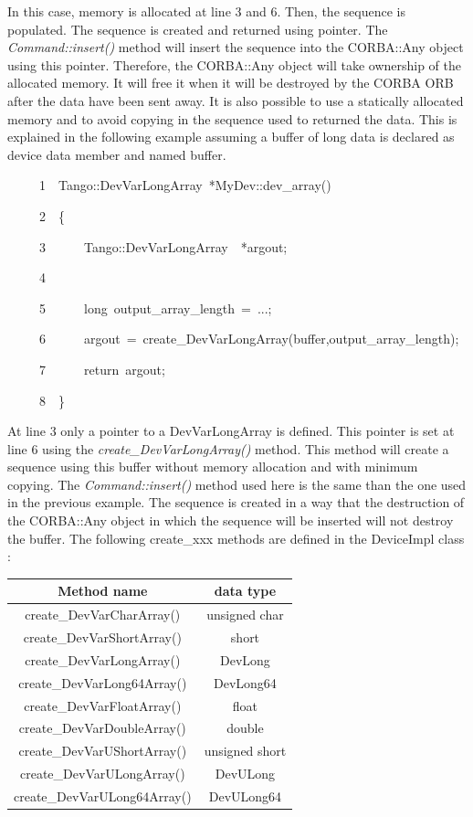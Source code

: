 In this case, memory is allocated at line 3 and 6. Then, the sequence
is populated. The sequence is created and returned using pointer.
The \emph{Command::insert()} method will insert the sequence into
the CORBA::Any object using this pointer. Therefore, the CORBA::Any
object will take ownership of the allocated memory. It will free it
when it will be destroyed by the CORBA ORB after the data have been
sent away. It is also possible to use a statically allocated memory
and to avoid copying in the sequence used to returned the data. This
is explained in the following example assuming a buffer of long data
is declared as device data member and named buffer.


\begin{lyxcode}
~~~~~1~~Tango::DevVarLongArray~{*}MyDev::dev\_array()

~~~~~2~~\{

~~~~~3~~~~~~Tango::DevVarLongArray~~{*}argout;

~~~~~4~~~~~~~~~~~~~~~~~~

~~~~~5~~~~~~long~output\_array\_length~=~...;

~~~~~6~~~~~~argout~=~create\_DevVarLongArray(buffer,output\_array\_length);

~~~~~7~~~~~~return~argout;

~~~~~8~~\}
\end{lyxcode}


At line 3 only a pointer to a DevVarLongArray is defined. This pointer
is set at line 6 using the \emph{create\_DevVarLongArray()}
method. This method will create a sequence using this buffer without
memory allocation and with minimum copying. The \emph{Command::insert()}
method used here is the same than the one used in the previous example.
The sequence is created in a way that the destruction of the CORBA::Any
object in which the sequence will be inserted will not destroy the
buffer. The following create\_xxx methods are defined in the DeviceImpl
class :

\vspace{0.3cm}

\begin{center}
\begin{longtable}{|c|c|}
\hline 
Method name & data type\tabularnewline
\hline 
\hline 
create\_DevVarCharArray() & unsigned char\tabularnewline
\hline 
create\_DevVarShortArray() & short\tabularnewline
\hline 
create\_DevVarLongArray() & DevLong\tabularnewline
\hline 
create\_DevVarLong64Array() & DevLong64\tabularnewline
\hline 
create\_DevVarFloatArray() & float\tabularnewline
\hline 
create\_DevVarDoubleArray() & double\tabularnewline
\hline 
create\_DevVarUShortArray() & unsigned short\tabularnewline
\hline 
create\_DevVarULongArray() & DevULong\tabularnewline
\hline 
create\_DevVarULong64Array() & DevULong64\tabularnewline
\hline 
\end{longtable}
\par\end{center}


